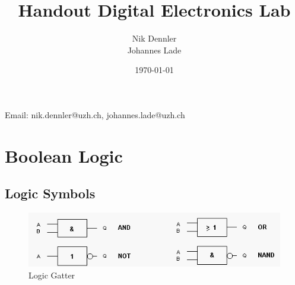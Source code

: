 \documentclass[10pt,a4paper]{article}
\author{Nik Dennler \\ Johannes Lade}
\title{Handout Digital Electronics Lab}
\date{\today{}}
\begin{document}
	
\begin{titlepage}
	\maketitle
		\begin{center}
			Email: nik.dennler@uzh.ch, johannes.lade@uzh.ch
		\end{center}
	\thispagestyle{empty}
\end{titlepage}




\newpage
\section{Boolean Logic}
\label{sec:exercise-block-1}

\subsection{Logic Symbols}


    \begin{figure}[H]
      \centering
      \includegraphics[width=1\textwidth]{gatter}%
      \caption{Logic Gatter}%
      \label{fig:gatter}
    \end{figure}
    
\end{document}
